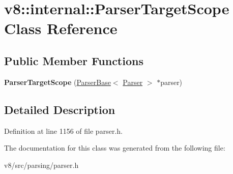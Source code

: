 \hypertarget{classv8_1_1internal_1_1ParserTargetScope}{}\section{v8\+:\+:internal\+:\+:Parser\+Target\+Scope Class Reference}
\label{classv8_1_1internal_1_1ParserTargetScope}
\subsection*{Public Member Functions}
\begin{DoxyCompactItemize}
\item 
\mbox{\label{classv8_1_1internal_1_1ParserTargetScope_a476b73cfba45367876c85a9265b0d2c9}} 
{\bfseries Parser\+Target\+Scope} (\mbox{\hyperlink{classv8_1_1internal_1_1ParserBase}{Parser\+Base}}$<$ \mbox{\hyperlink{classv8_1_1internal_1_1Parser}{Parser}} $>$ $\ast$parser)
\end{DoxyCompactItemize}


\subsection{Detailed Description}


Definition at line 1156 of file parser.\+h.



The documentation for this class was generated from the following file\+:\begin{DoxyCompactItemize}
\item 
v8/src/parsing/parser.\+h\end{DoxyCompactItemize}
